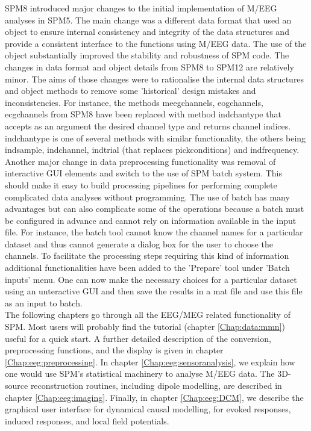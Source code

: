 SPM8 introduced major changes to the initial implementation of M/EEG analyses in SPM5. The main change was a different data format that used an object to ensure internal consistency and integrity of the data structures and provide a consistent interface to the functions using M/EEG data. The use of the object substantially improved  the stability and robustness of SPM code. The changes in data format and object details from SPM8 to SPM12 are relatively minor. The aims of those changes were to rationalise the internal data  structures and object methods to remove some 'historical' design mistakes and inconsistencies. For instance, the methods meegchannels, eogchannels, ecgchannels from SPM8 have been replaced with method indchantype that accepts as an argument the desired channel type and returns channel indices. indchantype is one of several methods with similar functionality, the others being indsample, indchannel, indtrial (that replaces pickconditions) and indfrequency.
\\
Another major change in data preprocessing functionality was removal of interactive GUI elements and switch to the use of SPM batch system. This should make it easy to build processing pipelines for performing complete complicated data analyses without programming. The use of batch has many advantages but can also complicate some of the operations because a batch must be configured in advance and cannot rely on information available in the input file. For instance, the batch tool cannot know the channel names for a particular dataset and thus cannot generate a dialog box for the user to choose the channels. To facilitate the processing steps requiring this kind of information additional functionalities have been added to the 'Prepare' tool under 'Batch inputs' menu. One can now make the necessary choices for a particular dataset using an unteractive GUI and then save the results in a mat file and use this file as an input to batch. 
\\
The following chapters go through all the EEG/MEG related functionality of SPM. Most users will probably find the tutorial (chapter \ref{Chap:data:mmn}) useful for a quick start.
A further detailed description of the conversion, preprocessing functions, and the display is given in chapter \ref{Chap:eeg:preprocessing}. In chapter \ref{Chap:eeg:sensoranalysis}, we explain how one would use SPM's statistical machinery to analyse M/EEG data. The 3D-source reconstruction routines, including dipole modelling, are described in chapter \ref{Chap:eeg:imaging}. Finally, in chapter \ref{Chap:eeg:DCM}, we describe the graphical user interface for dynamical causal modelling, for evoked responses, induced responses, and local field potentials.
